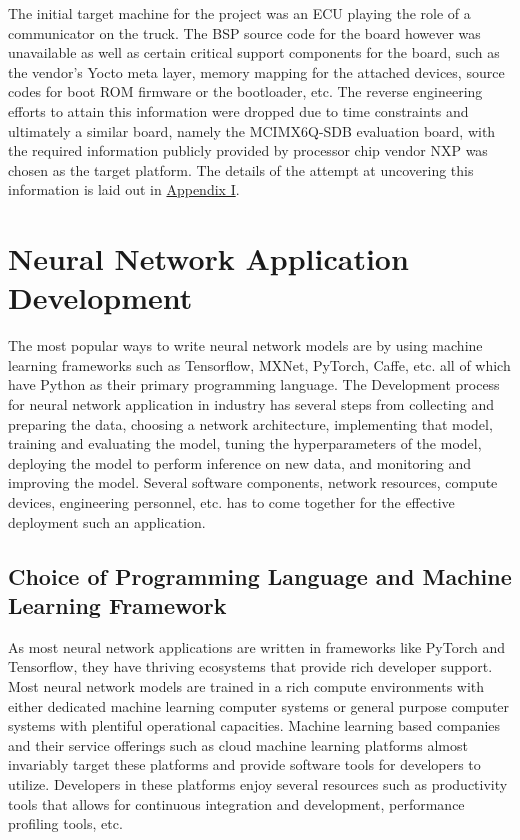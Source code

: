 The initial target machine for the project was an ECU playing the role of a communicator on the truck. The BSP source code for the board however was unavailable as well as certain critical support components for the board, such as the vendor's Yocto meta layer, memory mapping for the attached devices, source codes for boot ROM firmware or the bootloader, etc. The reverse engineering efforts to attain this information were dropped due to time constraints and ultimately a similar board, namely the MCIMX6Q-SDB evaluation board, with the required information publicly provided by processor chip vendor NXP was chosen as the target platform. The details of the attempt at uncovering this information is laid out in \hyperref[rtc-c300]{Appendix I}.

\section{Neural Network Application Development}

The most popular ways to write neural network models are by using machine learning frameworks such as Tensorflow, MXNet, PyTorch, Caffe, etc. all of which have Python as their primary programming language. The Development process for neural network application in industry has several steps from collecting and preparing the data, choosing a network architecture, implementing that model, training and evaluating the model, tuning the hyperparameters of the model, deploying the model to perform inference on new data, and monitoring and improving the model. Several software components, network resources, compute devices, engineering personnel, etc. has to come together for the effective deployment such an application.

\subsection{Choice of Programming Language and Machine Learning Framework}

As most neural network applications are written in frameworks like PyTorch and Tensorflow, they have thriving ecosystems that provide rich developer support. Most neural network models are trained in a rich compute environments with either dedicated machine learning computer systems or general purpose computer systems with plentiful operational capacities. Machine learning based companies and their service offerings such as cloud machine learning platforms almost invariably target these platforms and provide software tools for developers to utilize. Developers in these platforms enjoy several resources such as productivity tools that allows for continuous integration and development, performance profiling tools, etc.


